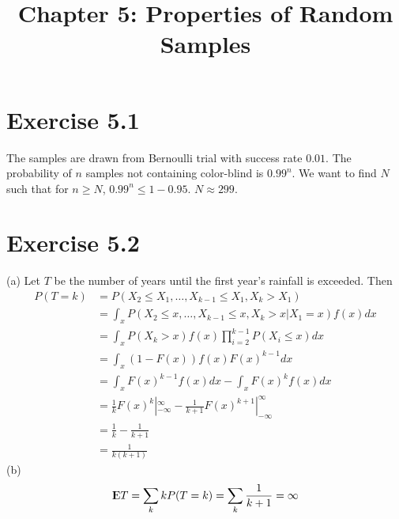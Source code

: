 \documentclass[12pt]{article}
\title{Chapter 5: Properties of Random Samples}
\begin{document}
\maketitle

\section*{Exercise 5.1}
The samples are drawn from Bernoulli trial with success rate $0.01$. The probability of $n$ samples not containing color-blind is $0.99^n$.  We want to find $N$ such that for $n \geq N$,  $0.99^n \leq 1- 0.95$. $N \approx 299$.

\section*{Exercise 5.2}
(a) Let $T$ be the number of years until the first year's rainfall is exceeded. Then 
$$\begin{aligned}
P(T=k) &= P(X_2 \leq X_1, \ldots , X_{k-1} \leq X_1, X_k > X_1) \\
&= \int_{x}  P(X_2 \leq x, \ldots , X_{k-1} \leq x, X_k > x | X_1 = x)f(x) dx \\
&= \int_{x} P(X_k > x) f(x) \prod_{i=2}^{k-1} P(X_i \leq x) dx  \\
&= \int_{x} (1- F(x)) f(x) F(x)^{k-1} dx  \\
&= \int_{x}  F(x)^{k-1}f(x) dx - \int_{x}  F(x)^k f(x) dx  \\
&= \frac{1}{k} F(x)^k|^{\infty}_{-\infty} - \frac{1}{k+1} F(x)^{k+1}|^{\infty}_{-\infty} \\
&= \frac{1}{k} - \frac{1}{k+1} \\
&= \frac{1}{k(k+1)}
\end{aligned} 
$$
(b) $${\rm I\kern-.3em E} T = \sum_k k P(T=k) = \sum_k \frac{1}{k+1} = \infty $$
\end{document}
